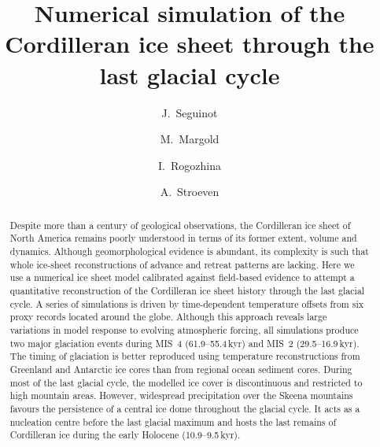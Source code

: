 \documentclass[tc, ms]{copernicus}
\begin{document}
\hack{\sloppy}

\title{Numerical simulation of the Cordilleran ice sheet
       through the last glacial cycle}

\author[1,2]{J.~Seguinot}
\author[3]{M.~Margold}
\author[2]{I.~Rogozhina}
\author[1]{A.~Stroeven}



\received{}
\accepted{}
\published{}

\maketitle

\begin{abstract}

  Despite more than a century of geological observations, the Cordilleran ice
  sheet of North America remains poorly understood in terms of its former
  extent, volume and dynamics. Although geomorphological evidence is abundant,
  its complexity is such that whole ice-sheet reconstructions of advance and
  retreat patterns are lacking. Here we use a numerical ice sheet model
  calibrated against field-based evidence to attempt a quantitative
  reconstruction of the Cordilleran ice sheet history through the last glacial
  cycle. A series of simulations is driven by time-dependent temperature
  offsets from six proxy records located around the globe. Although this
  approach reveals large variations in model response to evolving atmospheric
  forcing, all simulations produce two major glaciation events during MIS~4
  (61.9--55.4\,\unit{kyr}) and MIS~2 (29.5--16.9\,\unit{kyr}). The timing of
  glaciation is
  better reproduced using temperature reconstructions from Greenland and
  Antarctic ice cores than from regional ocean sediment cores. During most of
  the last glacial cycle, the modelled ice cover is discontinuous and
  restricted to high mountain areas. However, widespread precipitation over the
  Skeena mountains favours the persistence of a central ice dome throughout the
  glacial cycle. It acts as a nucleation centre before the last glacial maximum
  and hosts the last remains of Cordilleran ice during the
  early Holocene (10.9--9.5\,\unit{kyr}).

\end{abstract}
\end{document}
